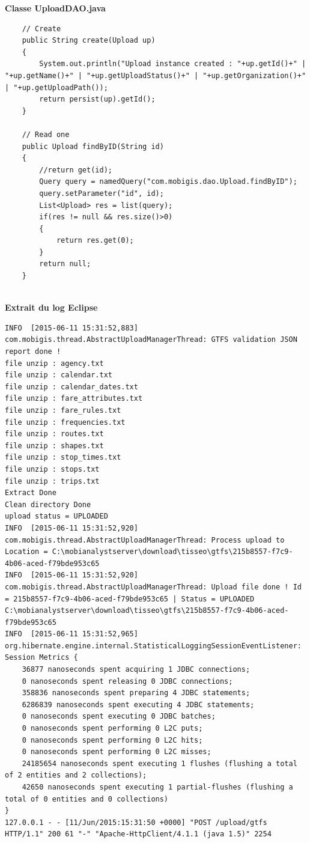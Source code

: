 \textbf{Classe UploadDAO.java}\\

\begin{lstlisting}
	// Create 
    public String create(Upload up)
    {
        System.out.println("Upload instance created : "+up.getId()+" | "+up.getName()+" | "+up.getUploadStatus()+" | "+up.getOrganization()+" | "+up.getUploadPath());
        return persist(up).getId();
    }

    // Read one
    public Upload findByID(String id)
    {
        //return get(id);
        Query query = namedQuery("com.mobigis.dao.Upload.findByID");
        query.setParameter("id", id);
        List<Upload> res = list(query);
        if(res != null && res.size()>0)
        {
            return res.get(0);
        }
        return null;
    }
\end{lstlisting} \\


\textbf{Extrait du log Eclipse}\\

\begin{lstlisting}
INFO  [2015-06-11 15:31:52,883] com.mobigis.thread.AbstractUploadManagerThread: GTFS validation JSON report done !
file unzip : agency.txt
file unzip : calendar.txt
file unzip : calendar_dates.txt
file unzip : fare_attributes.txt
file unzip : fare_rules.txt
file unzip : frequencies.txt
file unzip : routes.txt
file unzip : shapes.txt
file unzip : stop_times.txt
file unzip : stops.txt
file unzip : trips.txt
Extract Done
Clean directory Done
upload status = UPLOADED
INFO  [2015-06-11 15:31:52,920] com.mobigis.thread.AbstractUploadManagerThread: Process upload to Location = C:\mobianalystserver\download\tisseo\gtfs\215b8557-f7c9-4b06-aced-f79bde953c65
INFO  [2015-06-11 15:31:52,920] com.mobigis.thread.AbstractUploadManagerThread: Upload file done ! Id = 215b8557-f7c9-4b06-aced-f79bde953c65 | Status = UPLOADED
C:\mobianalystserver\download\tisseo\gtfs\215b8557-f7c9-4b06-aced-f79bde953c65
INFO  [2015-06-11 15:31:52,965] org.hibernate.engine.internal.StatisticalLoggingSessionEventListener: Session Metrics {
    36877 nanoseconds spent acquiring 1 JDBC connections;
    0 nanoseconds spent releasing 0 JDBC connections;
    358836 nanoseconds spent preparing 4 JDBC statements;
    6286839 nanoseconds spent executing 4 JDBC statements;
    0 nanoseconds spent executing 0 JDBC batches;
    0 nanoseconds spent performing 0 L2C puts;
    0 nanoseconds spent performing 0 L2C hits;
    0 nanoseconds spent performing 0 L2C misses;
    24185654 nanoseconds spent executing 1 flushes (flushing a total of 2 entities and 2 collections);
    42650 nanoseconds spent executing 1 partial-flushes (flushing a total of 0 entities and 0 collections)
}
127.0.0.1 - - [11/Jun/2015:15:31:50 +0000] "POST /upload/gtfs HTTP/1.1" 200 61 "-" "Apache-HttpClient/4.1.1 (java 1.5)" 2254
\end{lstlisting} 



